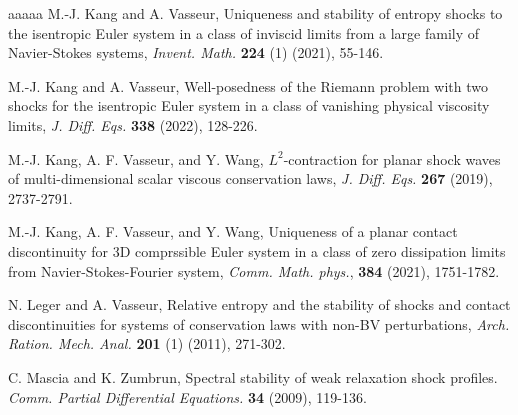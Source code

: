 \documentclass[10pt,reqno]{amsart}
\numberwithin{equation}{section}
\begin{document}
\begin{thebibliography}{aaaaa}
  M.-J. Kang and A. Vasseur, Uniqueness and stability of entropy shocks to the isentropic Euler system in a class of inviscid limits from a large family of Navier-Stokes systems, {\it Invent. Math.} {\bf 224} (1) (2021), 55-146.

  M.-J. Kang and A. Vasseur, Well-posedness of the Riemann problem with two shocks for the isentropic Euler system in a class of vanishing physical viscosity limits, {\it J. Diff. Eqs.} {\bf 338}  (2022), 128-226.

 M.-J. Kang, A. F. Vasseur, and Y. Wang, $L^2$-contraction for planar shock waves of multi-dimensional scalar viscous conservation laws, {\it J. Diff. Eqs.} {\bf 267}  (2019), 2737-2791.

 M.-J. Kang, A. F. Vasseur, and Y. Wang, Uniqueness of a planar contact discontinuity for 3D comprssible Euler system in a class of zero dissipation limits from Navier-Stokes-Fourier system, {\it Comm. Math. phys.}, {\bf 384}  (2021), 1751-1782.



  N. Leger and  A. Vasseur, Relative entropy and the stability of shocks and contact discontinuities for systems of conservation laws with non-BV perturbations, {\it Arch. Ration. Mech. Anal.} {\bf 201} (1) (2011), 271-302.




 C. Mascia and K. Zumbrun, Spectral stability of weak relaxation shock profiles. {\it Comm. Partial Differential Equations.} {\bf 34} (2009), 119-136.


\end{thebibliography}
\end{document}
